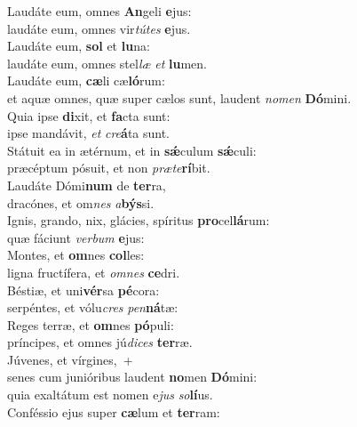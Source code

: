 \evenverse Laudáte eum, omnes \textbf{An}geli \textbf{e}jus:~\*\\
\evenverse laudáte eum, omnes vir\textit{tú}\textit{tes} \textbf{e}jus.\\
\oddverse Laudáte eum, \textbf{sol} et \textbf{lu}na:~\*\\
\oddverse laudáte eum, omnes stel\textit{læ} \textit{et} \textbf{lu}men.\\
\evenverse Laudáte eum, \textbf{cæ}li cæ\textbf{ló}rum:~\*\\
\evenverse et aquæ omnes, quæ super cælos sunt, laudent \textit{no}\textit{men} \textbf{Dó}mini.\\
\oddverse Quia ipse \textbf{di}xit, et \textbf{fa}cta sunt:~\*\\
\oddverse ipse mandávit, \textit{et} \textit{cre}\textbf{á}ta sunt.\\
\evenverse Státuit ea in ætérnum, et in \textbf{sǽ}culum \textbf{sǽ}culi:~\*\\
\evenverse præcéptum pósuit, et non \textit{præ}\textit{te}\textbf{rí}bit.\\
\oddverse Laudáte Dómi\textbf{num} de \textbf{ter}ra,~\*\\
\oddverse dracónes, et om\textit{nes} \textit{a}\textbf{býs}si.\\
\evenverse Ignis, grando, nix, glácies, spíritus \textbf{pro}cel\textbf{lá}rum:~\*\\
\evenverse quæ fáciunt \textit{ver}\textit{bum} \textbf{e}jus:\\
\oddverse Montes, et \textbf{om}nes \textbf{col}les:~\*\\
\oddverse ligna fructífera, et \textit{om}\textit{nes} \textbf{ce}dri.\\
\evenverse Béstiæ, et uni\textbf{vér}sa \textbf{pé}cora:~\*\\
\evenverse serpéntes, et vólu\textit{cres} \textit{pen}\textbf{ná}tæ:\\
\oddverse Reges terræ, et \textbf{om}nes \textbf{pó}puli:~\*\\
\oddverse príncipes, et omnes jú\textit{di}\textit{ces} \textbf{ter}ræ.\\
\evenverse Júvenes, et vírgines,~+\\
\evenverse  senes cum junióribus laudent \textbf{no}men \textbf{Dó}mini:~\*\\
\evenverse quia exaltátum est nomen e\textit{jus} \textit{so}\textbf{lí}us.\\
\oddverse Conféssio ejus super \textbf{cæ}lum et \textbf{ter}ram:~\*\\
